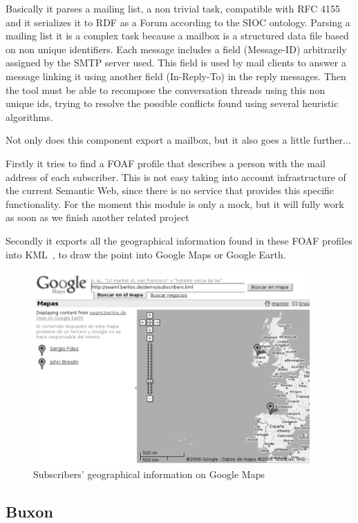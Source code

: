 \documentclass{llncs}
\begin{document}
Basically it parses a mailing list, a non trivial task, compatible with 
RFC 4155~\cite{RFC4155} and it serializes it to RDF as a Forum according 
to the SIOC ontology. Parsing a mailing list it is a complex task 
because a mailbox is a structured data file based on non unique identifiers.
Each message includes a field (\textsf{Message-ID}) arbitrarily assigned by 
the SMTP server used. This field is used by mail clients to answer a message
linking it using another field (\textsf{In-Reply-To}) in the reply messages. 
Then the tool must be able to recompose the conversation threads using this 
non unique ids, trying to resolve the possible conflicts found using several 
heuristic algorithms. %

Not only does this component export a mailbox, but it also goes a little 
further...

Firstly it tries to find a FOAF profile that describes a person with the 
mail address of each subscriber. This is not easy taking into account 
infrastructure of the current Semantic Web, since there is no service 
that provides this specific functionality. For the moment this module is 
only a mock, but it will fully work as soon as we finish another related 
project

Secondly it exports all the geographical information found in these FOAF 
profiles into KML~\cite{Ricket2006}, to draw the point into Google Maps or 
Google Earth.

\begin{figure}[ht]
 \centering
 \includegraphics[bb=0 0 400 280]{images/googlemaps.png}
 \caption{Subscribers' geographical information on Google Maps}
\end{figure}

\subsection{Buxon}
\end{document}
